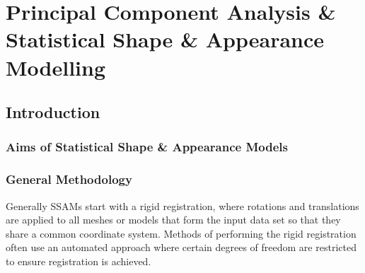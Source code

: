 \chapter{Principal Component Analysis \& Statistical Shape \& Appearance Modelling}

\section{Introduction}

\subsection{Aims of Statistical Shape \& Appearance Models}

\subsection{General Methodology}

Generally SSAMs start with a rigid registration, where rotations and translations are applied to all meshes or models that form the input data set so that they share a common coordinate system.
Methods of performing the rigid registration often use an automated approach where certain degrees of freedom are restricted to ensure registration is achieved. 



